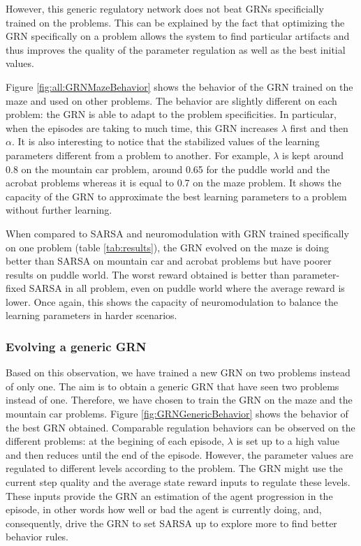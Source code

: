 However, this generic regulatory network does not beat GRNs specificially trained on the problems. This can be explained by the fact that optimizing the GRN specifically on a problem allows the system to find particular artifacts and thus improves the quality of the parameter regulation as well as the best initial values.

Figure \ref{fig:all:GRNMazeBehavior} shows the behavior of the GRN trained on the maze and used on other problems. The behavior are slightly different on each problem: the GRN is able to adapt to the problem specificities. In particular, when the episodes are taking to much time, this GRN increases $\lambda$ first and then $\alpha$. It is also interesting to notice that the stabilized values of the learning parameters different from a problem to another. For example, $\lambda$ is kept around 0.8 on the mountain car problem, around 0.65 for the puddle world and the acrobat problems whereas it is equal to 0.7 on the maze problem. It shows the capacity of the GRN to approximate the best learning parameters to a problem without further learning.

When compared to SARSA and neuromodulation with GRN trained specifically on one problem (table \ref{tab:results}), the GRN evolved on the maze is doing better than SARSA on mountain car and acrobat problems but have poorer results on puddle world. The worst reward obtained is better than parameter-fixed SARSA in all problem, even on puddle world where the average reward is lower. Once again, this shows the capacity of neuromodulation to balance the learning parameters in harder scenarios.

\subsubsection{Evolving a generic GRN}
Based on this observation, we have trained a new GRN on two problems instead of only one. The aim is to obtain a generic GRN that have seen two problems instead of one. Therefore, we have chosen to train the GRN on the maze and the mountain car problems. Figure \ref{fig:GRNGenericBehavior} shows the behavior of the best GRN obtained. Comparable regulation behaviors can be observed on the different problems: at the begining of each episode, $\lambda$ is set up to a high value and then reduces until the end of the episode. However, the parameter values are regulated to different levels according to the problem. The GRN might use the current step quality and the average state reward inputs to regulate these levels. These inputs provide the GRN an estimation of the agent progression in the episode, in other words how well or bad the agent is currently doing, and, consequently, drive the GRN to set SARSA up to explore more to find better behavior rules.

